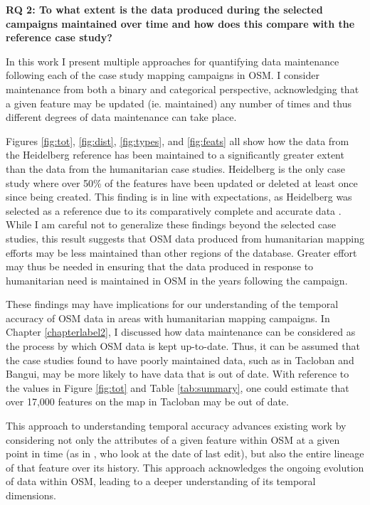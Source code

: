 \noindent\textbf{RQ 2: To what extent is the data produced during the selected campaigns maintained over time and how does this compare with the reference case study?}

In this work I present multiple approaches for quantifying data maintenance following each of the case study mapping campaigns in OSM. I consider maintenance from both a binary and categorical perspective, acknowledging that a given feature may be updated (ie. maintained) any number of times and thus different degrees of data maintenance can take place. 

Figures \ref{fig:tot}, \ref{fig:dist}, \ref{fig:types}, and \ref{fig:feats} all show how the data from the Heidelberg reference has been maintained to a significantly greater extent than the data from the humanitarian case studies. Heidelberg is the only case study where over 50\% of the features have been updated or deleted at least once since being created. This finding is in line with expectations, as Heidelberg was selected as a reference due to its comparatively complete and accurate data \parencite{arsanjani_assessing_2013}. While I am careful not to generalize these findings beyond the selected case studies, this result suggests that OSM data produced from humanitarian mapping efforts may be less maintained than other regions of the database. Greater effort may thus be needed in ensuring that the data produced in response to humanitarian need is maintained in OSM in the years following the campaign. 

These findings may have implications for our understanding of the temporal accuracy of OSM data in areas with humanitarian mapping campaigns. In Chapter \ref{chapterlabel2}, I discussed how data maintenance can be considered as the process by which OSM data is kept up-to-date. Thus, it can be assumed that the case studies found to have poorly maintained data, such as in Tacloban and Bangui, may be more likely to have data that is out of date. With reference to the values in Figure \ref{fig:tot} and Table \ref{tab:summary}, one could estimate that over 17,000 features on the map in Tacloban may be out of date.

This approach to understanding temporal accuracy advances existing work by considering not only the attributes of a given feature within OSM at a given point in time (as in \textcite{barron_comprehensive_2014}, who look at the date of last edit), but also the entire lineage of that feature over its history. This approach acknowledges the ongoing evolution of data within OSM, leading to a deeper understanding of its temporal dimensions. 

